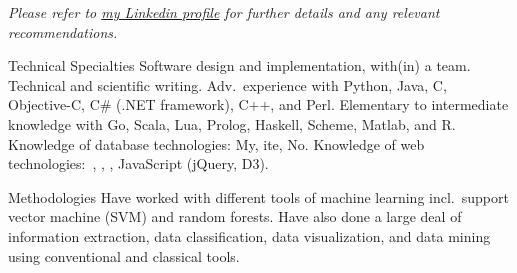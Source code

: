 \documentclass[10pt,a4paper]{article}
\begin{document}
\begin{center}
\textit{Please refer to \href{http://ca.linkedin.com/in/asafatli}{my Linkedin profile} for further details and any relevant recommendations.}
\end{center}

\spacedhrule{-0.2em}{-0.4em} %



\nocite{Latent2012}
\nocite{DCSI2012}
\nocite{Ref2013}
\nocite{Lisbon2015}
\printbibliography[heading=none]

\spacedhrule{0.5em}{-0.4em} %





\spacedhrule{0.5em}{-0.4em} %



\inlineheadsection
{Technical Specialties}
{Software design and implementation, with(in) a team. Technical and scientific writing. Adv.\ experience with Python, Java, C, Objective-C, C\# (.NET framework), C++, and Perl. Elementary to intermediate knowledge with Go, Scala, Lua, Prolog, Haskell, Scheme, Matlab, and R. Knowledge of database technologies: My, ite, No. Knowledge of web technologies:\ , , , JavaScript (jQuery, D3).}

\inlineheadsection 
{Methodologies}
{Have worked with different tools of machine learning incl.\ support vector machine (SVM) and random forests. Have also done a large deal of information extraction, data classification, data visualization, and data mining using conventional and classical tools.}
\end{document}
